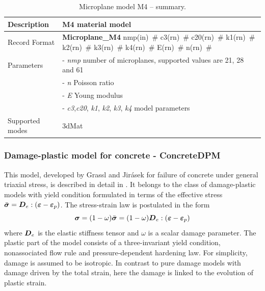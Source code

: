 \documentclass[a4paper]{article}
\newcommand{\mbf}[1]{\mbox{\boldmath$#1$}}
\newcommand{\descitem}[1]{{\noindent \bf #1}}
\newcommand{\elemparam}[2]{{{#1\tiny (#2)}~\#}}
\newcommand{\param}[1]{{\it #1}}
\newcommand{\veps}{\mbf{\varepsilon}}  %
\newcommand{\vsig}{\mbf{\sigma}}%
\begin{document}
\begin{table}[!htb]
\begin{tabular}{|l|p{9cm}|}
\hline
Description & M4 material model\\
\hline
Record Format & \descitem{Microplane\_M4}  \elemparam{nmp}{in}
\elemparam{c3}{rn} \elemparam{c20}{rn} \elemparam{k1}{rn}
\elemparam{k2}{rn} \elemparam{k3}{rn} \elemparam{k4}{rn}
\elemparam{E}{rn} \elemparam{n}{rn} \\
Parameters &- \param{nmp} number of microplanes, supported values are
21, 28 and 61\\
&- \param{n} Poisson ratio\\
&- \param{E} Young modulus \\
&- \param{c3},\param{c20}, \param{k1}, \param{k2}, \param{k3},
\param{k4}  model parameters\\
Supported modes& 3dMat\\
\hline
\end{tabular}
\caption{Microplane model M4 -- summary.}
\label{m4_table}
\end{table}

\newcommand{\beq}{\begin{equation}}
\newcommand{\eeq}{\end{equation}}
\newcommand{\fc}{\bar{f}_c}
\newcommand{\ft}{\bar{f}_t}
\newcommand{\mD}{\mbf{D}}
\newcommand{\qh}{q_{\rm h}}

\subsubsection{Damage-plastic model for concrete - ConcreteDPM}

This model, developed by Grassl and Jir\'{a}sek for failure of concrete
under general triaxial stress, is described in detail in \cite{GraJir}.
It belongs to the class of damage-plastic models with yield condition formulated
in terms of the effective stress $\bar{\vsig}=\mD_e:(\veps-\veps_p)$.
The stress-strain law is postulated in the form 
\beq
\vsig = (1-\omega)\bar{\vsig}=(1-\omega)\mD_e:(\veps-\veps_p)
\eeq
where $\mD_e$ is the elastic stiffness tensor
and $\omega$ is a scalar damage parameter. 
The plastic part of the model consists of a three-invariant yield condition, nonassociated flow rule and pressure-dependent hardening law. 
For simplicity, damage is assumed to be isotropic.
In contrast to pure damage models with damage driven by the total strain, here the damage is linked to the evolution of plastic strain.
\end{document}
